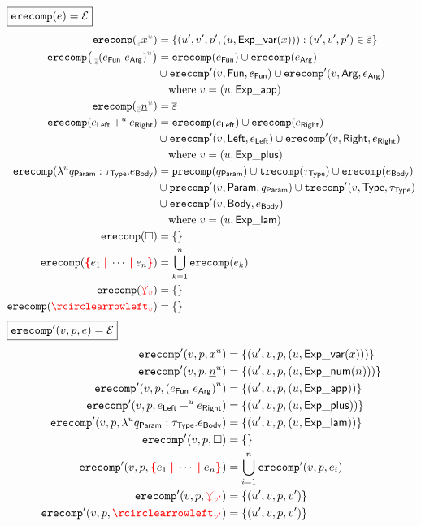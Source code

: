 \noindent $\boxed{\operatorname{\texttt{erecomp}}\mathopen{}\left(e\right)\mathclose{} = \mathcal{E}}$
%
\begin{align*}
  \erecomp{\eVar{\backrefs}{u}{x}} &= \SetOf{(u', v', p', (u, \ExpVar(x))) \SuchThat{(u', v', p') \in \backrefs}}
  \\
  \erecomp{\eApp{\backrefs}{u}{e_\AppFun}{e_\AppArg}}
  &= \erecomp{e_\AppFun}
  \cup \erecomp{e_\AppArg} \\
  &\cup \erecompPrime{v}{\AppFun}{e_\AppFun}
  \cup \erecompPrime{v}{\AppArg}{e_\AppArg} \\
  &\quad\text{where } v = (u, \ExpApp)
  \\
  \erecomp{\eNum{\backrefs}{u}{n}} &= \backrefs
  \\
  \erecomp{\plusExp{e_\PlusLeft}{u}{e_\PlusRight}}
  &= \erecomp{e_\PlusLeft}
  \cup \erecomp{e_\PlusRight} \\
  &\cup \erecompPrime{v}{\PlusLeft}{e_\PlusLeft}
  \cup \erecompPrime{v}{\PlusRight}{e_\PlusRight} \\
  &\quad\text{where } v = (u, \ExpPlus)
  \\
  \erecomp{\lamExp{u}{q_\LamParam}{\tau_\LamType}{e_\LamBody}}
  &= \precomp{q_\LamParam}
  \cup \trecomp{\tau_\LamType}
  \cup \erecomp{e_\LamBody} \\
  &\cup \precompPrime{v}{\LamParam}{q_\LamParam}
  \cup \trecompPrime{v}{\LamType}{\tau_\LamType} \\
  &\cup \erecompPrime{v}{\LamBody}{e_\LamBody} \\
  &\quad\text{where } v = (u, \ExpLam)
  \\
  \erecomp{\hole} &= \SetOf{}
  \\
  \erecomp{\conflictHole{e_1, \cdots, e_n}}
  &= \bigcup_{k=1}^n \erecomp{e_k}
  \\
  \erecomp{\multiVertex{v}} &= \SetOf{}
  \\
  \erecomp{\cycleVertex{v}} &= \SetOf{}
\end{align*}
%
$\boxed{\operatorname{\operatorname{\texttt{erecomp}}^\prime}\mathopen{}\left(v, p, e\right)\mathclose{} = \mathcal{E}}$
%
\begin{align*}
  \erecompPrime{v}{p}{\varExp{x}{u}}
  &= \SetOf{(u', v, p, (u, \ExpVar(x)))}
  \\
  \erecompPrime{v}{p}{\numExp{n}{u}}
  &= \SetOf{(u', v, p, (u, \ExpNum(n)))}
  \\
  \erecompPrime{v}{p}{\appExp{e_\AppFun}{e_\AppArg}{u}}
  &= \SetOf{(u', v, p, (u, \ExpApp))}
  \\
  \erecompPrime{v}{p}{\plusExp{e_\PlusLeft}{u} {e_\PlusRight}}
  &= \SetOf{(u', v, p, (u, \ExpPlus))}
  \\
  \erecompPrime{v}{p}{\lamExp{u}{q_\LamParam}{\tau_\LamType}{e_\LamBody}}
  &= \SetOf{(u', v, p, (u, \ExpLam))}
  \\
  \erecompPrime{v}{p}{\hole} &= \SetOf{}
  \\
  \erecompPrime{v}{p}{\conflictHole{e_1, \cdots, e_n}}
  &= \bigcup_{i=1}^n \erecompPrime{v}{p}{e_i}
  \\
  \erecompPrime{v}{p}{\multiVertex{v'}}
  &= \SetOf{(u', v, p, v')}
  \\
  \erecompPrime{v}{p}{\cycleVertex{v'}}
  &= \SetOf{(u', v, p, v')}
\end{align*}
